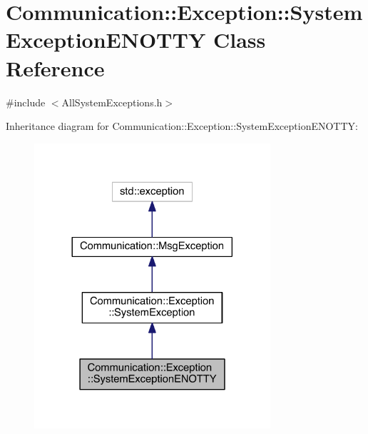 \hypertarget{class_communication_1_1_exception_1_1_system_exception_e_n_o_t_t_y}{}\section{Communication\+:\+:Exception\+:\+:System\+Exception\+E\+N\+O\+T\+T\+Y Class Reference}
\label{class_communication_1_1_exception_1_1_system_exception_e_n_o_t_t_y}


{\ttfamily \#include $<$All\+System\+Exceptions.\+h$>$}



Inheritance diagram for Communication\+:\+:Exception\+:\+:System\+Exception\+E\+N\+O\+T\+T\+Y\+:\nopagebreak
\begin{figure}[H]
\begin{center}
\leavevmode
\includegraphics[width=248pt]{class_communication_1_1_exception_1_1_system_exception_e_n_o_t_t_y__inherit__graph}
\end{center}
\end{figure}


